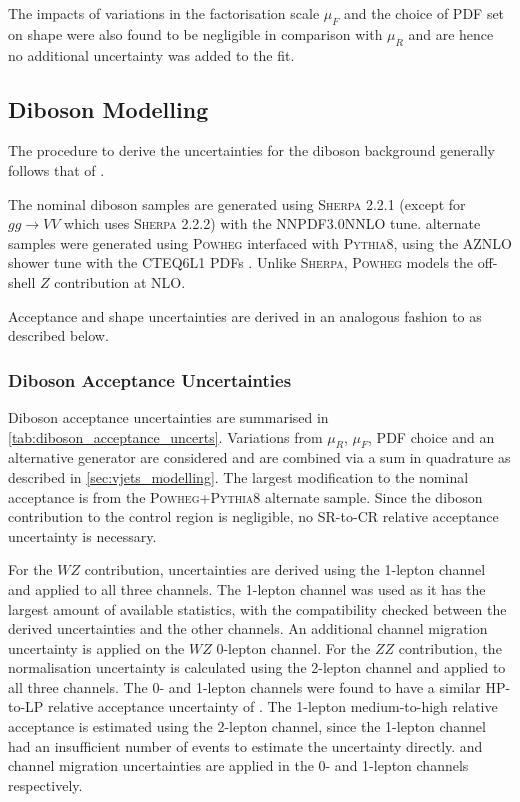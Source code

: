 The impacts of variations in the factorisation scale $\mu_{F}$ and the choice of PDF set on \mJ shape were also found to be negligible in comparison with $\mu_{R}$ and are hence no additional uncertainty was added to the fit.


\subsection{Diboson Modelling}\label{sec:diboson_modelling}

The procedure to derive the uncertainties for the diboson background generally follows that of \Vjets.

The nominal diboson samples are generated using \textsc{Sherpa} 2.2.1 (except for $gg\rightarrow VV$ which uses \textsc{Sherpa} 2.2.2) with the NNPDF3.0NNLO tune.
alternate samples were generated using \textsc{Powheg} interfaced with \textsc{Pythia8}, using the AZNLO shower tune with the CTEQ6L1 PDFs \cite{Pumplin:2002:CTEQ6L1}.
Unlike \textsc{Sherpa}, \textsc{Powheg} models the off-shell $Z$ contribution at NLO.

Acceptance and shape uncertainties are derived in an analogous fashion to \Vjets as described below.

\subsubsection{Diboson Acceptance Uncertainties}

Diboson acceptance uncertainties are summarised in \cref{tab:diboson_acceptance_uncerts}.
Variations from $\mu_R$, $\mu_F$, PDF choice and an alternative generator are considered and are combined via a sum in quadrature as described in \cref{sec:vjets_modelling}.
The largest modification to the nominal acceptance is from the \textsc{Powheg+Pythia8} alternate sample.
Since the diboson contribution to the \ttbar control region is negligible, no SR-to-CR relative acceptance uncertainty is necessary.

For the $WZ$ contribution, uncertainties are derived using the 1-lepton channel and applied to all three channels.
The 1-lepton channel was used as it has the largest amount of available statistics, with the compatibility checked between the derived uncertainties and the other channels.
An additional  channel migration uncertainty is applied on the $WZ$ 0-lepton channel.
For the $ZZ$ contribution, the normalisation uncertainty is calculated using the 2-lepton channel and applied to all three channels.
The 0- and 1-lepton channels were found to have a similar HP-to-LP relative acceptance uncertainty of .
The 1-lepton medium-to-high \ptv relative acceptance is estimated using the 2-lepton channel, since the 1-lepton channel had an insufficient number of events to estimate the uncertainty directly.
 and  channel migration uncertainties are applied in the 0- and 1-lepton channels respectively.

